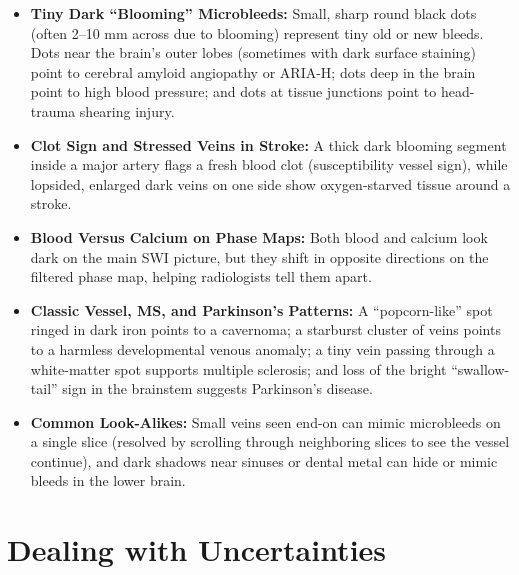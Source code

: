 \begin{itemize}
    \item \textbf{Tiny Dark ``Blooming'' Microbleeds:} Small, sharp round black dots (often 2--10 mm across due to blooming) represent tiny old or new bleeds. Dots near the brain's outer lobes (sometimes with dark surface staining) point to cerebral amyloid angiopathy or ARIA-H; dots deep in the brain point to high blood pressure; and dots at tissue junctions point to head-trauma shearing injury.
    \item \textbf{Clot Sign and Stressed Veins in Stroke:} A thick dark blooming segment inside a major artery flags a fresh blood clot (susceptibility vessel sign), while lopsided, enlarged dark veins on one side show oxygen-starved tissue around a stroke.
    \item \textbf{Blood Versus Calcium on Phase Maps:} Both blood and calcium look dark on the main SWI picture, but they shift in opposite directions on the filtered phase map, helping radiologists tell them apart.
    \item \textbf{Classic Vessel, MS, and Parkinson's Patterns:} A ``popcorn-like'' spot ringed in dark iron points to a cavernoma; a starburst cluster of veins points to a harmless developmental venous anomaly; a tiny vein passing through a white-matter spot supports multiple sclerosis; and loss of the bright ``swallow-tail'' sign in the brainstem suggests Parkinson's disease.
    \item \textbf{Common Look-Alikes:} Small veins seen end-on can mimic microbleeds on a single slice (resolved by scrolling through neighboring slices to see the vessel continue), and dark shadows near sinuses or dental metal can hide or mimic bleeds in the lower brain.
\end{itemize}

\section{Dealing with Uncertainties}

